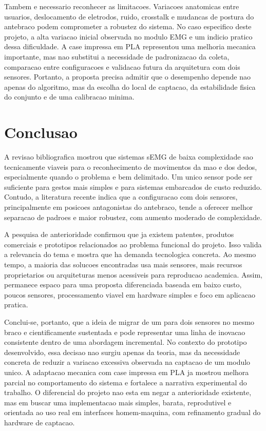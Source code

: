 \documentclass[12pt,oneside,a4paper,english,brazilian]{abntex2}
\begin{document}
Tambem e necessario reconhecer as limitacoes. Variacoes anatomicas entre usuarios, deslocamento de eletrodos, ruido, crosstalk e mudancas de postura do antebraco podem comprometer a robustez do sistema. No caso especifico deste projeto, a alta variacao inicial observada no modulo EMG e um indicio pratico dessa dificuldade. A case impressa em PLA representou uma melhoria mecanica importante, mas nao substitui a necessidade de padronizacao da coleta, comparacao entre configuracoes e validacao futura da arquitetura com dois sensores. Portanto, a proposta precisa admitir que o desempenho depende nao apenas do algoritmo, mas da escolha do local de captacao, da estabilidade fisica do conjunto e de uma calibracao minima.

\section{Conclusao}

A revisao bibliografica mostrou que sistemas sEMG de baixa complexidade sao tecnicamente viaveis para o reconhecimento de movimentos da mao e dos dedos, especialmente quando o problema e bem delimitado. Um unico sensor pode ser suficiente para gestos mais simples e para sistemas embarcados de custo reduzido. Contudo, a literatura recente indica que a configuracao com dois sensores, principalmente em posicoes antagonistas do antebraco, tende a oferecer melhor separacao de padroes e maior robustez, com aumento moderado de complexidade.

A pesquisa de anterioridade confirmou que ja existem patentes, produtos comerciais e prototipos relacionados ao problema funcional do projeto. Isso valida a relevancia do tema e mostra que ha demanda tecnologica concreta. Ao mesmo tempo, a maioria das solucoes encontradas usa mais sensores, mais recursos proprietarios ou arquiteturas menos acessiveis para reproducao academica. Assim, permanece espaco para uma proposta diferenciada baseada em baixo custo, poucos sensores, processamento viavel em hardware simples e foco em aplicacao pratica.

Conclui-se, portanto, que a ideia de migrar de um para dois sensores no mesmo braco e cientificamente sustentada e pode representar uma linha de inovacao consistente dentro de uma abordagem incremental. No contexto do prototipo desenvolvido, essa decisao nao surgiu apenas da teoria, mas da necessidade concreta de reduzir a variacao excessiva observada na captacao de um modulo unico. A adaptacao mecanica com case impressa em PLA ja mostrou melhora parcial no comportamento do sistema e fortalece a narrativa experimental do trabalho. O diferencial do projeto nao esta em negar a anterioridade existente, mas em buscar uma implementacao mais simples, barata, reprodutivel e orientada ao uso real em interfaces homem-maquina, com refinamento gradual do hardware de captacao.
\end{document}
